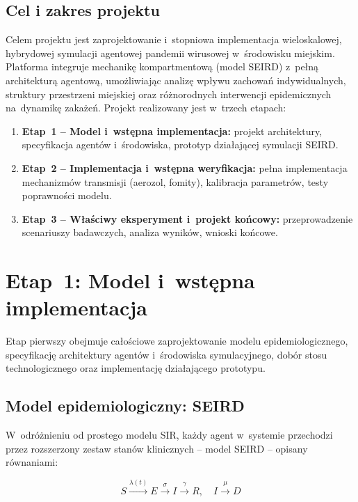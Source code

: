 \documentclass[polish]{projectreport}
\begin{document}
\subsection{Cel i zakres projektu}
\label{sec:goal}

Celem projektu jest zaprojektowanie i~stopniowa implementacja wieloskalowej,
hybrydowej symulacji agentowej pandemii wirusowej w~środowisku miejskim.
Platforma integruje mechanikę kompartmentową (model SEIRD) z~pełną
architekturą agentową, umożliwiając analizę wpływu zachowań indywidualnych,
struktury przestrzeni miejskiej oraz różnorodnych interwencji epidemicznych
na~dynamikę zakażeń. Projekt realizowany jest w~trzech etapach:

\begin{enumerate}
  \item \textbf{Etap~1 -- Model i~wstępna implementacja:} projekt architektury,
        specyfikacja agentów i~środowiska, prototyp działającej symulacji SEIRD.
  \item \textbf{Etap~2 -- Implementacja i~wstępna weryfikacja:} pełna implementacja
        mechanizmów transmisji (aerozol, fomity), kalibracja parametrów,
        testy poprawności modelu.
  \item \textbf{Etap~3 -- Właściwy eksperyment i~projekt końcowy:} przeprowadzenie
        scenariuszy badawczych, analiza wyników, wnioski końcowe.
\end{enumerate}

\section{Etap~1: Model i~wstępna implementacja}
\label{sec:stage1}

Etap pierwszy obejmuje całościowe zaprojektowanie modelu epidemiologicznego,
specyfikację architektury agentów i~środowiska symulacyjnego, dobór stosu
technologicznego oraz implementację działającego prototypu.

\subsection{Model epidemiologiczny: SEIRD}
\label{sec:seird}

W~odróżnieniu od prostego modelu SIR, każdy agent w~systemie przechodzi
przez rozszerzony zestaw stanów klinicznych -- model SEIRD -- opisany
równaniami:

\begin{equation}
  S \xrightarrow{\lambda(t)} E \xrightarrow{\sigma} I \xrightarrow{\gamma}
  R, \quad I \xrightarrow{\mu} D
  \label{eq:seird}
\end{equation}
\end{document}
